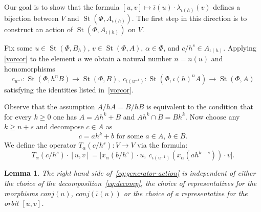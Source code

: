 \documentclass[oneside, 11pt]{amsart} \pdfoutput=1
\newcommand{\St}{\mathop{\mathrm{St}}\nolimits}
\numberwithin{equation}{section}
\newtheorem{lemma}{Lemma} \numberwithin{lemma}{section}
\theoremstyle{definition}
\begin{document}
Our goal is to show that the formula $[u, v] \mapsto \overline{\iota}(u) \cdot \lambda_{\iota(h)}(v)$ defines a bijection between $V$ and $\St(\Phi, A_{\iota(h)})$. The first step in this direction is to construct an action of $\St(\Phi, A_{\iota(h)})$ on $V$. 

Fix some $u \in \St(\Phi, B_h)$, $v \in \St(\Phi, A)$, $\alpha \in \Phi$, and $c/{h^s} \in A_{\iota(h)}$.
Applying \cref{vorcor} to the element $u$ we obtain a natural number $n=n(u)$ and homomorphisms \begin{equation} \label{eq:c-homs} c_{u^{-1}}\colon \St(\Phi, h^nB) \to \St(\Phi, B),\ c_{\overline{\iota}(u^{-1})}\colon \St(\Phi, \iota(h)^nA) \to \St(\Phi, A)\end{equation}
satisfying the identities listed in~\cref{vorcor}.

Observe that the assumption $A/hA = B/hB$ is equivalent to the condition that for every $k \geq 0$ one has $A = Ah^k + B$ and $Ah^k \cap B = Bh^k$. Now choose any $k \geq n + s$ and decompose $c \in A$ as
 \begin{equation} \label{eq:decomp} c = ah^k + b\text{ for some }a \in A,\ b \in B. \end{equation}
We define the operator $T_\alpha(c/h^s) \colon V \to V$ via the formula:
\begin{equation}\label{eq:generator-action}
\textstyle
T_\alpha(c/{h^s}) \cdot [u, v] = \bigl[x_\alpha(b/{h^s})\cdot u,\ c_{\overline{\iota}(u^{-1})}(x_\alpha(ah^{k - s})) \cdot v\bigr].
\end{equation}
\begin{lemma}\label{well-def}
The right hand side of~\eqref{eq:generator-action} is independent of either the choice of the decomposition~\eqref{eq:decomp}, the choice of representatives for the morphisms $conj(u)$, $conj(\overline{\iota}(u))$ or the choice of a representative for the orbit $[u, v]$.
\end{lemma}
\end{document}
